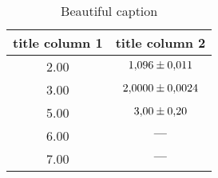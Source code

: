 \begin{table}
 \caption{Beautiful caption}
 \label{tab:important_label}
 \centering
{}
 \begin{tabular}{SS}
 \toprule 
    {title column 1}& {title column 2} \\
      & $\num{1.096\pm0.011}$ \\
           3.00 & $\num{2.0000\pm0.0024}$ \\
           5.00 & $\num{3.00\pm0.20}$ \\
           6.00 & $\text{\textbf{---}}$ \\
           7.00 & $\text{\textbf{---}}$ \\
 \bottomrule
 \end{tabular}
\end{table}